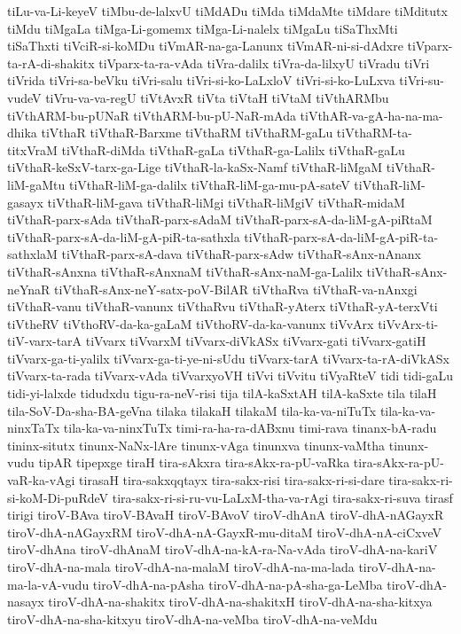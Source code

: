 {tiLu-va-Li-keyeV
tiMbu-de-lalxvU
tiMdADu
tiMda
tiMdaMte
tiMdare
tiMditutx
tiMdu
tiMgaLa
tiMga-Li-gomemx
tiMga-Li-nalelx
tiMgaLu
tiSaThxMti
tiSaThxti
tiVciR-si-koMDu
tiVmAR-na-ga-Lanunx
tiVmAR-ni-si-dAdxre
tiVparx-ta-rA-di-shakitx
tiVparx-ta-ra-vAda
tiVra-dalilx
tiVra-da-lilxyU
tiVradu
tiVri
tiVrida
tiVri-sa-beVku
tiVri-salu
tiVri-si-ko-LaLxloV
tiVri-si-ko-LuLxva
tiVri-su-vudeV
tiVru-va-va-regU
tiVtAvxR
tiVta
tiVtaH
tiVtaM
tiVthARMbu
tiVthARM-bu-pUNaR
tiVthARM-bu-pU-NaR-mAda
tiVthAR-va-gA-ha-na-ma-dhika
tiVthaR
tiVthaR-Barxme
tiVthaRM
tiVthaRM-gaLu
tiVthaRM-ta-titxVraM
tiVthaR-diMda
tiVthaR-gaLa
tiVthaR-ga-Lalilx
tiVthaR-gaLu
tiVthaR-keSxV-tarx-ga-Lige
tiVthaR-la-kaSx-Namf
tiVthaR-liMgaM
tiVthaR-liM-gaMtu
tiVthaR-liM-ga-dalilx
tiVthaR-liM-ga-mu-pA-sateV
tiVthaR-liM-gasayx
tiVthaR-liM-gava
tiVthaR-liMgi
tiVthaR-liMgiV
tiVthaR-midaM
tiVthaR-parx-sAda
tiVthaR-parx-sAdaM
tiVthaR-parx-sA-da-liM-gA-piRtaM
tiVthaR-parx-sA-da-liM-gA-piR-ta-sathxla
tiVthaR-parx-sA-da-liM-gA-piR-ta-sathxlaM
tiVthaR-parx-sA-dava
tiVthaR-parx-sAdw
tiVthaR-sAnx-nAnanx
tiVthaR-sAnxna
tiVthaR-sAnxnaM
tiVthaR-sAnx-naM-ga-Lalilx
tiVthaR-sAnx-neYnaR
tiVthaR-sAnx-neY-satx-poV-BilAR
tiVthaRva
tiVthaR-va-nAnxgi
tiVthaR-vanu
tiVthaR-vanunx
tiVthaRvu
tiVthaR-yAterx
tiVthaR-yA-terxVti
tiVtheRV
tiVthoRV-da-ka-gaLaM
tiVthoRV-da-ka-vanunx
tiVvArx
tiVvArx-ti-tiV-varx-tarA
tiVvarx
tiVvarxM
tiVvarx-diVkASx
tiVvarx-gati
tiVvarx-gatiH
tiVvarx-ga-ti-yalilx
tiVvarx-ga-ti-ye-ni-sUdu
tiVvarx-tarA
tiVvarx-ta-rA-diVkASx
tiVvarx-ta-rada
tiVvarx-vAda
tiVvarxyoVH
tiVvi
tiVvitu
tiVyaRteV
tidi
tidi-gaLu
tidi-yi-lalxde
tidudxdu
tigu-ra-neV-risi
tija
tilA-kaSxtAH
tilA-kaSxte
tila
tilaH
tila-SoV-Da-sha-BA-geVna
tilaka
tilakaH
tilakaM
tila-ka-va-niTuTx
tila-ka-va-ninxTaTx
tila-ka-va-ninxTuTx
timi-ra-ha-ra-dABxnu
timi-rava
tinanx-bA-radu
tininx-situtx
tinunx-NaNx-lAre
tinunx-vAga
tinunxva
tinunx-vaMtha
tinunx-vudu
tipAR
tipepxge
tiraH
tira-sAkxra
tira-sAkx-ra-pU-vaRka
tira-sAkx-ra-pU-vaR-ka-vAgi
tirasaH
tira-sakxqqtayx
tira-sakx-risi
tira-sakx-ri-si-dare
tira-sakx-ri-si-koM-Di-puRdeV
tira-sakx-ri-si-ru-vu-LaLxM-tha-va-rAgi
tira-sakx-ri-suva
tirasf
tirigi
tiroV-BAva
tiroV-BAvaH
tiroV-BAvoV
tiroV-dhAnA
tiroV-dhA-nAGayxR
tiroV-dhA-nAGayxRM
tiroV-dhA-nA-GayxR-mu-ditaM
tiroV-dhA-nA-ciCxveV
tiroV-dhAna
tiroV-dhAnaM
tiroV-dhA-na-kA-ra-Na-vAda
tiroV-dhA-na-kariV
tiroV-dhA-na-mala
tiroV-dhA-na-malaM
tiroV-dhA-na-ma-lada
tiroV-dhA-na-ma-la-vA-vudu
tiroV-dhA-na-pAsha
tiroV-dhA-na-pA-sha-ga-LeMba
tiroV-dhA-nasayx
tiroV-dhA-na-shakitx
tiroV-dhA-na-shakitxH
tiroV-dhA-na-sha-kitxya
tiroV-dhA-na-sha-kitxyu
tiroV-dhA-na-veMba
tiroV-dhA-na-veMdu
}
